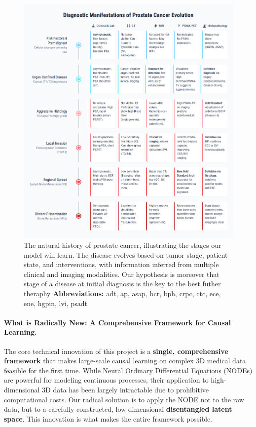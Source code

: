 \documentclass[11pt, a4paper]{article}
\begin{document}
\begin{figure}[H]
    \centering
    \includegraphics[width=\textwidth]{pe.png}
    \caption{The natural history of prostate cancer, illustrating the stages our model will learn. The disease evolves based on tumor stage, patient state, and interventions, with information inferred from multiple clinical and imaging modalities. Our hypothesis is moreover that stage of a disease at initial diagnosis is the key to the best futher theraphy \textbf{Abbreviations:} \gls{adt}, \gls{ap}, \gls{asap}, \gls{bcr}, \gls{bph}, \gls{crpc}, \gls{ctc}, \gls{ece}, \gls{ene}, \gls{hgpin}, \gls{lvi}, \gls{psadt}}
    \label{fig:prostate_evolution}
\end{figure}

\paragraph{What is Radically New: A Comprehensive Framework for Causal Learning.}
The core technical innovation of this project is a \textbf{single, comprehensive framework} that makes large-scale causal learning on complex 3D medical data feasible for the first time. While Neural Ordinary Differential Equations (NODEs) are powerful for modeling continuous processes, their application to high-dimensional 3D data has been largely intractable due to prohibitive computational costs. Our radical solution is to apply the NODE not to the raw data, but to a carefully constructed, low-dimensional \textbf{disentangled latent space}. This innovation is what makes the entire framework possible.
\end{document}
